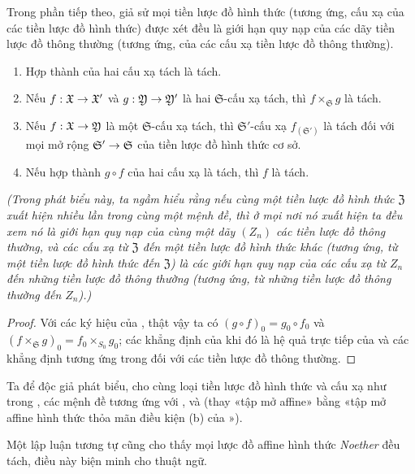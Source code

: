 \documentclass[oneside]{amsart}
\makeatletter
\newcommand{\ega@arrow}[2]{\mathchoice{#1}{#2}{#2}{#2}}
\renewcommand{\to}{\ega@arrow{\longrightarrow}{\rightarrow}}
\newcommand{\oldpage}[2][]{{\marginnote{\normalfont\textbf{#1}~|~#2}}\ignorespaces}
\let\EGAOriginalLabel\label
\renewcommand{\label}[1]{\phantomsection\EGAOriginalLabel{#1}}
\makeatother
\begin{document}
\begin{proposition}[10.15.3]
\label{I.10.15.3}
Trong phần tiếp theo, giả sử mọi tiền lược đồ hình thức (tương ứng, cấu xạ của các tiền lược đồ hình thức) được xét đều là giới hạn quy nạp của các dãy tiền lược đồ thông thường (tương ứng, của các cấu xạ tiền lược đồ thông thường).
\begin{enumerate}
    \item[\rm{(i)}] Hợp thành của hai cấu xạ tách là tách.
    \item[\rm{(ii)}] Nếu $f:\mathfrak{X}\to\mathfrak{X}'$ và $g:\mathfrak{Y}\to\mathfrak{Y}'$ là hai $\mathfrak{S}$-cấu xạ tách, thì $f\times_\mathfrak{S}g$ là tách.
    \item[\rm{(iii)}] Nếu $f:\mathfrak{X}\to\mathfrak{Y}$ là một $\mathfrak{S}$-cấu xạ tách, thì $\mathfrak{S}'$-cấu xạ $f_{(\mathfrak{S}')}$ là tách đối với mọi mở rộng $\mathfrak{S}'\to\mathfrak{S}$ của tiền lược đồ hình thức cơ sở.
    \item[\rm{(iv)}] Nếu hợp thành $g\circ f$ của hai cấu xạ là tách, thì $f$ là tách.
\end{enumerate}
\emph{(Trong phát biểu này, ta ngầm hiểu rằng nếu cùng một tiền lược đồ hình thức $\mathfrak{Z}$ xuất hiện nhiều lần trong cùng một mệnh đề, thì ở mọi nơi nó xuất hiện ta đều xem nó là giới hạn quy nạp của \emph{cùng một} dãy $(Z_n)$ các tiền lược đồ thông thường, và các cấu xạ từ $\mathfrak{Z}$ đến một tiền lược đồ hình thức khác (tương ứng, từ một tiền lược đồ hình thức đến $\mathfrak{Z}$) là các giới hạn quy nạp của các cấu xạ từ $Z_n$ đến những tiền lược đồ thông thường (tương ứng, từ những tiền lược đồ thông thường đến $Z_n$).)}
\end{proposition}

\begin{proof}
Với các ký hiệu của , thật vậy ta có $(g\circ f)_0=g_0\circ f_0$ và $(f\times_\mathfrak{S}g)_0=f_0\times_{S_0}g_0$;
các khẳng định của  khi đó là hệ quả trực tiếp của  và các khẳng định tương ứng trong  đối với các tiền lược đồ thông thường.
\end{proof}

Ta để độc giả phát biểu, cho cùng loại tiền lược đồ hình thức và cấu xạ như trong , các mệnh đề tương ứng với ,
\oldpage[I]{213}
 và  (thay «tập mở affine» bằng «tập mở affine hình thức thỏa mãn điều kiện (b) của »).

Một lập luận tương tự cũng cho thấy mọi lược đồ affine hình thức \emph{Noether} đều tách, điều này biện minh cho thuật ngữ.
\end{document}
